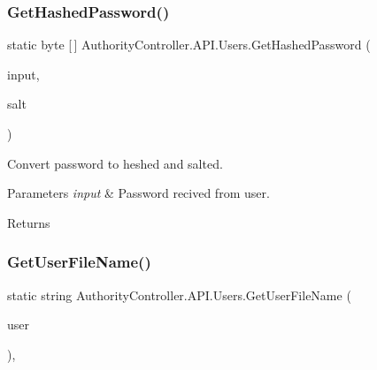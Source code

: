 \subsubsection{\texorpdfstring{Get\+Hashed\+Password()}{GetHashedPassword()}}
{\footnotesize\ttfamily static byte \mbox{[}$\,$\mbox{]} Authority\+Controller.\+A\+P\+I.\+Users.\+Get\+Hashed\+Password (\begin{DoxyParamCaption}\item[{string}]{input,  }\item[{\mbox{\hyperlink{class_authority_controller_1_1_data_1_1_application_1_1_salt_container}{Salt\+Container}}}]{salt }\end{DoxyParamCaption})\hspace{0.3cm}{\ttfamily [static]}}



Convert password to heshed and salted. 


\begin{DoxyParams}{Parameters}
{\em input} & Password recived from user.\\
\hline
\end{DoxyParams}
\begin{DoxyReturn}{Returns}

\end{DoxyReturn}
\mbox{\label{class_authority_controller_1_1_a_p_i_1_1_users_ac0cc8d945690970c7bac5432fb9baf11}} 
\subsubsection{\texorpdfstring{Get\+User\+File\+Name()}{GetUserFileName()}}
{\footnotesize\ttfamily static string Authority\+Controller.\+A\+P\+I.\+Users.\+Get\+User\+File\+Name (\begin{DoxyParamCaption}\item[{\mbox{\hyperlink{class_authority_controller_1_1_data_1_1_personal_1_1_user}{User}}}]{user }\end{DoxyParamCaption})\hspace{0.3cm}{\ttfamily [static]}, {\ttfamily [private]}}




